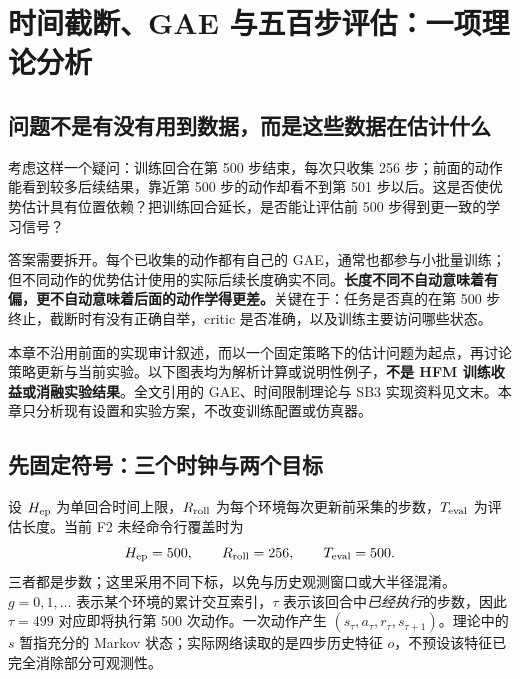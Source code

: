 \documentclass[12pt,fontset=none]{ctexart}
\numberwithin{equation}{section}
\numberwithin{table}{section}
\numberwithin{figure}{section}
\begin{document}
\clearpage
\section{时间截断、GAE 与五百步评估：一项理论分析}\label{sec:gae-time-analysis}

\subsection{问题不是有没有用到数据，而是这些数据在估计什么}

考虑这样一个疑问：训练回合在第 500 步结束，每次只收集 256 步；前面的动作能看到较多后续结果，靠近第 500 步的动作却看不到第 501 步以后。这是否使优势估计具有位置依赖？把训练回合延长，是否能让评估前 500 步得到更一致的学习信号？

答案需要拆开。每个已收集的动作都有自己的 GAE，通常也都参与小批量训练；但不同动作的优势估计使用的实际后续长度确实不同。\textbf{长度不同不自动意味着有偏，更不自动意味着后面的动作学得更差。}关键在于：任务是否真的在第 500 步终止，截断时有没有正确自举，critic 是否准确，以及训练主要访问哪些状态。

本章不沿用前面的实现审计叙述，而以一个固定策略下的估计问题为起点，再讨论策略更新与当前实验。以下图表均为解析计算或说明性例子，\textbf{不是 HFM 训练收益或消融实验结果}。全文引用的 GAE、时间限制理论与 SB3 实现资料见文末\cite{Agae,Atimelimits,Asb3rollout,Asb3buffer}。本章只分析现有设置和实验方案，不改变训练配置或仿真器。

\subsection{先固定符号：三个时钟与两个目标}

设 $H_{\rm ep}$ 为单回合时间上限，$R_{\rm roll}$ 为每个环境每次更新前采集的步数，$T_{\rm eval}$ 为评估长度。当前 F2 未经命令行覆盖时为
\begin{equation}\label{eq:gaet-threeclocks}
 H_{\rm ep}=500,\qquad R_{\rm roll}=256,\qquad T_{\rm eval}=500.
\end{equation}
三者都是步数；这里采用不同下标，以免与历史观测窗口或大半径混淆。$g=0,1,\ldots$ 表示某个环境的累计交互索引，$\tau$ 表示该回合中\emph{已经执行}的步数，因此 $\tau=499$ 对应即将执行第 500 次动作。一次动作产生 $(s_\tau,a_\tau,r_\tau,s_{\tau+1})$。理论中的 $s$ 暂指充分的 Markov 状态；实际网络读取的是四步历史特征 $o$，不预设该特征已完全消除部分可观测性。
\end{document}
